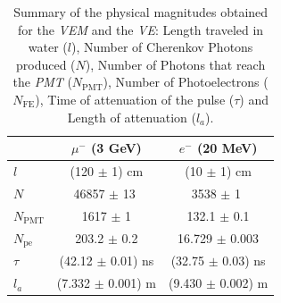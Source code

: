 \documentclass[submitting]{nst}
\begin{document}
\begin{table}[h!]
\label{t:comparacion}
\centering
\caption{Summary of the physical magnitudes obtained for the \textsl{VEM} and the \textsl{VE}: Length traveled in water ($l$), Number of Cherenkov Photons produced ($N$), Number of Photons that reach the \textsl{PMT} ($N_{\mathrm{PMT}}$), Number of Photoelectrons ($N_{\mathrm{FE}}$), Time of attenuation of the pulse ($\tau $) and Length of attenuation ($l_a$).}

\begin{tabular}{l|c|c|}
\cline{2-3}
                                                     & \textbf{$\mu^-$ (3 GeV) }& \textbf{$e^-$ (20 MeV)} \\ \hline
\multicolumn{1}{|l|}{\textbf{$l$}}   &          (120 $\pm$ 1) cm      &    (10 $\pm$ 1) cm        \\ \hline
\multicolumn{1}{|l|}{\textbf{$N$}}    &         46857 $\pm$ 13 $ $   &      3538 $\pm$ 1 $ $      \\ \hline
\multicolumn{1}{|l|}{$N_{\mathrm{PMT}}$}       &          1617 $\pm$ 1     &     132.1 $\pm$ 0.1      \\ \hline
\multicolumn{1}{|l|}{$N_{\mathrm{pe}}$}       &          203.2 $\pm$ 0.2      &     16.729 $\pm$ 0.003       \\ \hline
\multicolumn{1}{|l|}{$\tau$} &          (42.12 $\pm$ 0.01) ns      &      (32.75 $\pm$ 0.03) ns      \\ \hline
\multicolumn{1}{|l|}{$l_a$} &          (7.332 $\pm$ 0.001) m      &      (9.430 $\pm$ 0.002) m      \\ \hline
\end{tabular}
\end{table}

\end{document}
